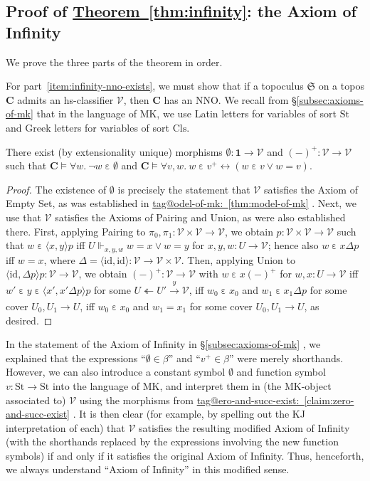\documentclass{amsart}
\makeatletter
\newcommand\alttext{\texorpdfstring}
\newcommand\bC{\mathbf{C}}
\newcommand\br[1]{\langle{}#1\rangle{}}
\newcommand\Cls{\mathrm{Cls}}
\newcommand\cV{\mathcal{V}}
\newcommand\ein{\mathrel{\varepsilon}}
\newcommand\fS{\mathfrak{S}}
\newcommand\id{\mathrm{id}}
\newcommand\oot{\twoheadleftarrow}
\newcommand\St{\mathrm{St}}
\newcommand\tm{\mathbf{1}}
\newcommand\tot{\leftrightarrow}
\newcommand\tox[2][]{\xrightarrow[#1]{#2}}
\newcommand\tagword[1]{\csname tag@#1\endcsname}
\def\label@tag#1:#2\@nil{#1}
\newcommand\labeltag[1]{\label@tag#1:\@nil}
\newcommand\jref[1]{%
  \texorpdfstring%
    {\hyperref[#1]{\tagword{\labeltag{#1}}~\ref*{#1}}}%
    {\tagword{\labeltag{#1}}~\ref*{#1}}%
}
\newcommand\prerefpost[3]{%
  \texorpdfstring%
    {\hyperref[#2]{#1\ref*{#2}#3}}%
    {#1\ref*{#2}#3}%
}
\newcommand\sref[1]{\prerefpost{\S}{#1}{}}
\theoremstyle{definition}
\theoremstyle{remark}
\theoremstyle{plainwithref}
\makeatother
\begin{document}
\subsection{Proof of \alttext{\hyperref[thm:infinity]{Theorem~\ref*{thm:infinity}}}{Theorem~\ref*{thm:infinity}}: the Axiom of Infinity} \label{subsec:infinity-proof}
We prove the three parts of the theorem in order.

For part~\ref{item:infinity-nno-exists}, we must show that if a topoculus \( \fS \) on a topos \( \bC \) admits an hs-classifier \( \cV \), then \( \bC \) has an NNO.
We recall from \sref{subsec:axioms-of-mk} that in the language of MK, we use Latin letters for variables of sort \( \St \) and Greek letters for variables of sort \( \Cls \).
\begin{claim} \label{claim:zero-and-succ-exist}
  There exist (by extensionality unique) morphisms \( \emptyset \colon \tm \to \cV \) and \( (-)^+ \colon \cV \to \cV \) such that \( \bC \vDash \forall w.\ \neg w \ein \emptyset \) and \( \bC \vDash \forall v,w.\ w \ein v^+ \tot (w \ein v \vee w = v) \).
\end{claim}
\begin{proof}
  The existence of \( \emptyset \) is precisely the statement that \( \cV \) satisfies the Axiom of Empty Set, as was established in \jref{thm:model-of-mk}.
  Next, we use that \( \cV \) satisfies the Axioms of Pairing and Union, as were also established there.
  First, applying Pairing to \( \pi_0, \pi_1 \colon \cV \times \cV \to \cV \), we obtain \( p \colon \cV \times \cV \to \cV \) such that \( w \ein \br{x,y} p \) iff \( U \Vdash_{x,y,w} w = x \vee w = y \) for \( x,y,w \colon U \to \cV \); hence also \( w \ein x \Delta p \) iff \( w = x \), where \( \Delta = \br{\id, \id} \colon \cV \to \cV \times \cV \).
  Then, applying Union to \( \br{\id, \Delta p} p \colon \cV \to \cV \), we obtain \( (-)^+ \colon \cV \to \cV \) with \( w \ein x (-)^+ \) for \( w, x \colon U \to \cV \) iff \( w' \ein y \ein \br{x', x' \Delta p} p \) for some \( U \oot U' \tox{y} \cV \), iff \( w_0 \ein x_0 \) and \( w_1 \ein x_1 \Delta p \) for some cover \( U_0,U_1 \to U \), iff \( w_0 \ein x_0 \) and \( w_1 = x_1 \) for some cover \( U_0,U_1 \to U \), as desired.
\end{proof}
In the statement of the Axiom of Infinity in \sref{subsec:axioms-of-mk}, we explained that the expressions ``\( \emptyset \in \beta \)'' and ``\( v^+ \in \beta \)'' were merely shorthands.
However, we can also introduce a constant symbol \( \emptyset \) and function symbol \( v \colon \St \to \St \) into the language of MK, and interpret them in (the MK-object associated to) \( \cV \) using the morphisms from \jref{claim:zero-and-succ-exist}.
It is then clear (for example, by spelling out the KJ interpretation of each) that \( \cV \) satisfies the resulting modified Axiom of Infinity (with the shorthands replaced by the expressions involving the new function symbols) if and only if it satisfies the original Axiom of Infinity.
Thus, henceforth, we always understand ``Axiom of Infinity'' in this modified sense.
\end{document}
